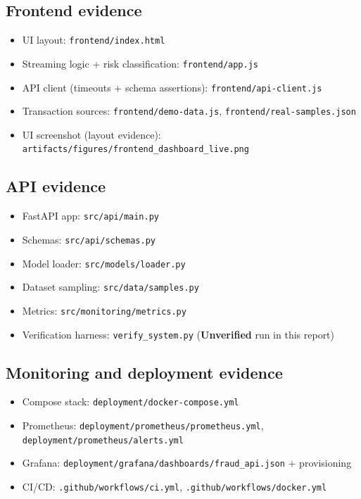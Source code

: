 \documentclass[11pt]{article}
\newcommand{\code}[1]{\texttt{#1}}
\newcommand{\statusunverified}{\textbf{Unverified}}
\begin{document}
\subsection{Frontend evidence}
\begin{itemize}
  \item UI layout: \code{frontend/index.html}
  \item Streaming logic + risk classification: \code{frontend/app.js}
  \item API client (timeouts + schema assertions): \code{frontend/api-client.js}
  \item Transaction sources: \code{frontend/demo-data.js}, \code{frontend/real-samples.json}
  \item UI screenshot (layout evidence): \code{artifacts/figures/frontend_dashboard_live.png}
\end{itemize}

\subsection{API evidence}
\begin{itemize}
  \item FastAPI app: \code{src/api/main.py}
  \item Schemas: \code{src/api/schemas.py}
  \item Model loader: \code{src/models/loader.py}
  \item Dataset sampling: \code{src/data/samples.py}
  \item Metrics: \code{src/monitoring/metrics.py}
  \item Verification harness: \code{verify_system.py} (\statusunverified{} run in this report)
\end{itemize}

\subsection{Monitoring and deployment evidence}
\begin{itemize}
  \item Compose stack: \code{deployment/docker-compose.yml}
  \item Prometheus: \code{deployment/prometheus/prometheus.yml}, \code{deployment/prometheus/alerts.yml}
  \item Grafana: \code{deployment/grafana/dashboards/fraud_api.json} + provisioning
  \item CI/CD: \code{.github/workflows/ci.yml}, \code{.github/workflows/docker.yml}
\end{itemize}
\end{document}
